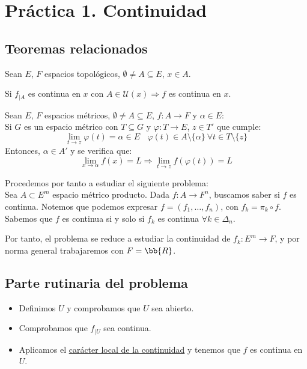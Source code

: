 \chapter{Práctica 1. Continuidad}

\section{Teoremas relacionados}
\begin{teo}
    Sean $E$, $F$ espacios topológicos, $\emptyset \neq A \subseteq E$, $x \in A$.

    
    Si $f_{\big| A}$ es continua en $x$ con $A \in \mathcal{U}(x) \Rightarrow f$ es continua en $x$.
\end{teo}

\begin{teo}
    Sean $E$, $F$ espacios métricos, $\emptyset \neq A \subseteq E$, $f:A \rightarrow F$
    y $\alpha \in E$:\\

    
    Si $G$ es un espacio métrico con $T \subseteq G$ y $\varphi:T \rightarrow E$, $z \in T'$ que cumple:
    $$\lim_{t \to z}\varphi(t)=\alpha \in E ~~~~ \varphi(t) \in A\setminus\{\alpha\} ~\forall t \in T\setminus\{z\}$$
    Entonces, $\alpha \in A'$ y se verifica que:
    $$\lim_{x \to \alpha} f(x) = L \Rightarrow \lim_{t \to z}f(\varphi(t)) = L$$
\end{teo}

\vspace{2cm}

Procedemos por tanto a estudiar el siguiente problema:\\

\noindent
Sea $A\subset E^m$ espacio métrico producto. Dada $f:A \rightarrow F^n$, buscamos saber si $f$ es continua. Notemos que podemos expresar $f=(f_1,\dots,f_n)$, con $f_k=\pi_k\circ f$. Sabemos que $f$ es continua si y solo si $f_k$ es continua $\forall k\in \Delta_n$.

Por tanto, el problema se reduce a estudiar la continuidad de $f_k:E^m\to F$, y por norma general trabajaremos con $F=\bb{R}$.

\section{Parte rutinaria del problema}
\begin{itemize}
    \item Definimos $U$ y comprobamos que $U$ sea abierto.
    \item Comprobamos que $f_{\big|U}$ sea continua.
    \item Aplicamos el \underline{carácter local de la continuidad} y tenemos que $f$ es continua en $U$.
\end{itemize}


